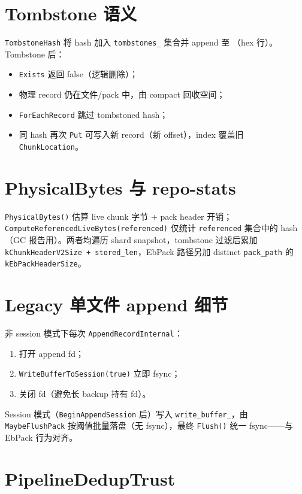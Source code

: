 \section{Tombstone 语义}

\texttt{TombstoneHash} 将 hash 加入 \texttt{tombstones\_} 集合并 append 至 （hex 行）。Tombstone 后：
\begin{itemize}[nosep]
  \item \texttt{Exists} 返回 false（逻辑删除）；
  \item 物理 record 仍在文件/pack 中，由 compact 回收空间；
  \item \texttt{ForEachRecord} 跳过 tombstoned hash；
  \item 同 hash 再次 \texttt{Put} 可写入新 record（新 offset），index 覆盖旧 \texttt{ChunkLocation}。
\end{itemize}

\section{PhysicalBytes 与 repo-stats}

\texttt{PhysicalBytes()} 估算 live chunk 字节 + pack header 开销；\texttt{ComputeReferencedLiveBytes(referenced)} 仅统计 \texttt{referenced} 集合中的 hash（GC 报告用）。两者均遍历 shard snapshot，tombstone 过滤后累加 \texttt{kChunkHeaderV2Size + stored\_len}，EbPack 路径另加 distinct \texttt{pack\_path} 的 \texttt{kEbPackHeaderSize}。

\section{Legacy 单文件 append 细节}

非 session 模式下每次 \texttt{AppendRecordInternal}：
\begin{enumerate}[nosep]
  \item 打开 append fd；
  \item \texttt{WriteBufferToSession(true)} 立即 fsync；
  \item 关闭 fd（避免长 backup 持有 fd）。
\end{enumerate}

Session 模式（\texttt{BeginAppendSession} 后）写入 \texttt{write\_buffer\_}，由 \texttt{MaybeFlushPack} 按阈值批量落盘（无 fsync），最终 \texttt{Flush()} 统一 fsync——与 EbPack 行为对齐。

\section{PipelineDedupTrust}

